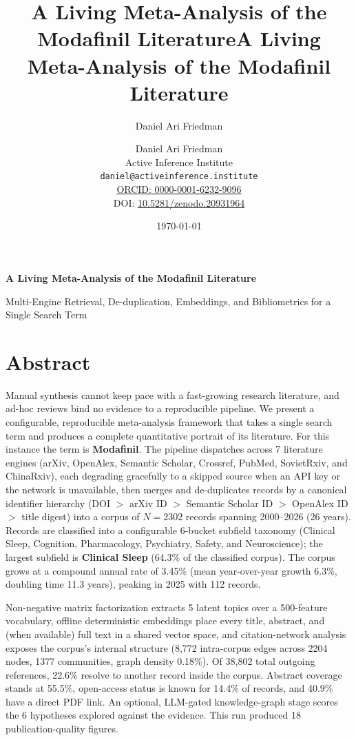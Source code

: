 \documentclass[
  english,
]{article}
\title{A Living Meta-Analysis of the Modafinil Literature}
\author{Daniel Ari Friedman}
\date{}
\title{A Living Meta-Analysis of the Modafinil Literature}
\author{Daniel Ari Friedman\\\footnotesize{Active Inference Institute}\\\footnotesize{\texttt{daniel@activeinference.institute}}\\\footnotesize{\href{https://orcid.org/0000-0001-6232-9096}{ORCID: 0000-0001-6232-9096}} \\ \footnotesize{DOI: \href{https://doi.org/10.5281/zenodo.20931964}{10.5281/zenodo.20931964}}}
\date{\today}
\begin{document}
\begin{titlepage}
\centering
\vspace*{2cm}
{\LARGE\bfseries A Living Meta-Analysis of the Modafinil Literature\par}
\vspace{0.75em}
{\large Multi-Engine Retrieval, De-duplication, Embeddings, and Bibliometrics for a Single Search Term\par}
\vfill
\makeatletter
{\@author\par}
\vspace{1em}
{\@date\par}
\makeatother
\vfill
\end{titlepage}
\thispagestyle{empty}
\tableofcontents
\newpage

\section{Abstract}\label{abstract}

Manual synthesis cannot keep pace with a fast-growing research
literature, and ad-hoc reviews bind no evidence to a reproducible
pipeline. We present a configurable, reproducible meta-analysis
framework that takes a single search term and produces a complete
quantitative portrait of its literature. For this instance the term is
\textbf{Modafinil}. The pipeline dispatches across 7 literature engines
(arXiv, OpenAlex, Semantic Scholar, Crossref, PubMed, SovietRxiv, and
ChinaRxiv), each degrading gracefully to a skipped source when an API
key or the network is unavailable, then merges and de-duplicates records
by a canonical identifier hierarchy (DOI \(>\) arXiv ID \(>\) Semantic
Scholar ID \(>\) OpenAlex ID \(>\) title digest) into a corpus of
\(N = 2302\) records spanning 2000--2026 (26 years). Records are
classified into a configurable 6-bucket subfield taxonomy (Clinical
Sleep, Cognition, Pharmacology, Psychiatry, Safety, and Neuroscience);
the largest subfield is \textbf{Clinical Sleep} (64.3\% of the
classified corpus). The corpus grows at a compound annual rate of 3.45\%
(mean year-over-year growth 6.3\%, doubling time 11.3 years), peaking in
2025 with 112 records.

Non-negative matrix factorization extracts 5 latent topics over a
500-feature vocabulary, offline deterministic embeddings place every
title, abstract, and (when available) full text in a shared vector
space, and citation-network analysis exposes the corpus's internal
structure (8,772 intra-corpus edges across 2204 nodes, 1377 communities,
graph density 0.18\%). Of 38,802 total outgoing references, 22.6\%
resolve to another record inside the corpus. Abstract coverage stands at
55.5\%, open-access status is known for 14.4\% of records, and 40.9\%
have a direct PDF link. An optional, LLM-gated knowledge-graph stage
scores the 6 hypotheses explored against the evidence. This run produced
18 publication-quality figures.
\end{document}
